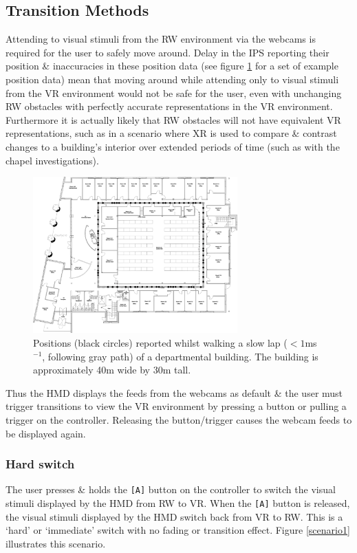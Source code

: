 \subsection{Transition Methods}
Attending to visual stimuli from the RW environment via the webcams is required for the user to safely move around. Delay in the IPS reporting their position \& inaccuracies in these position data (see figure \ref{jack-cole-splodges} for a set of example position data) mean that moving around while attending only to visual stimuli from the VR environment would not be safe for the user, even with unchanging RW obstacles with perfectly accurate representations in the VR environment. Furthermore it is actually likely that RW obstacles will not have equivalent VR representations, such as in a scenario where XR is used to compare \& contrast changes to a building's interior over extended periods of time (such as with the chapel investigations).

\begin{figure}[h]
	\begin{center}
		\includegraphics[width=0.7\textwidth]{images/jack-cole-splodges-black.png}
		\caption{Positions (black circles) reported whilst walking a slow lap ($<1$ms$^{-1}$, following gray path) of a departmental building. The building is approximately 40m wide by 30m tall.}
		\label{jack-cole-splodges}
	\end{center}
\end{figure}

Thus the HMD displays the feeds from the webcams as default \& the user must trigger transitions to view the VR environment by pressing a button or pulling a trigger on the controller. Releasing the button/trigger causes the webcam feeds to be displayed again.

\clearpage

\subsubsection{Hard switch}
\label{sub-hardswitch}
The user presses \& holds the \texttt{[A]} button on the controller to switch the visual stimuli displayed by the HMD from RW to VR. When the \texttt{[A]} button is released, the visual stimuli displayed by the HMD switch back from VR to RW. This is a `hard' or `immediate' switch with no fading or transition effect. Figure \ref{scenario1} illustrates this scenario.

